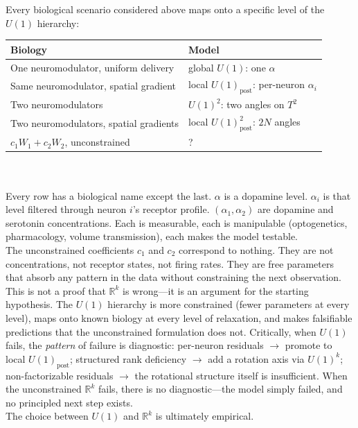 \documentclass[11pt,a4paper]{article}
\newcommand{\R}{\mathbb{R}}
\begin{document}
{Every biological scenario considered above maps onto a specific 
level of the $U(1)$ hierarchy:

\begin{center}
\renewcommand{\arraystretch}{1.3}
\begin{tabular}{@{}ll@{}}
\toprule
\textbf{Biology} & \textbf{Model} \\
\midrule
One neuromodulator, uniform delivery & 
global $U(1)$: one $\alpha$ \\
Same neuromodulator, spatial gradient & 
local $U(1)_{\text{post}}$: per-neuron $\alpha_i$ \\
Two neuromodulators & 
$U(1)^2$: two angles on $T^2$ \\
Two neuromodulators, spatial gradients & 
local $U(1)^2_{\text{post}}$: $2N$ angles \\[3pt]
$c_1 W_1 + c_2 W_2$, unconstrained & ? \\
\bottomrule
\end{tabular}
\end{center}
\\
\\
Every row has a biological name except the last. $\alpha$ is a 
dopamine level. $\alpha_i$ is that level filtered through neuron 
$i$'s receptor profile. $(\alpha_1, \alpha_2)$ are dopamine and 
serotonin concentrations. Each is measurable, each is manipulable 
(optogenetics, pharmacology, volume transmission), each makes the 
model testable.
\\
The unconstrained coefficients $c_1$ and $c_2$ correspond to 
nothing. They are not concentrations, not receptor states, not 
firing rates. They are free parameters that absorb any pattern 
in the data without constraining the next observation.
\\
This is not a proof that $\R^k$ is wrong---it is an argument 
for the starting hypothesis. The $U(1)$ hierarchy is more 
constrained (fewer parameters at every level), maps onto known 
biology at every level of relaxation, and makes falsifiable 
predictions that the unconstrained formulation does not. 
Critically, when $U(1)$ fails, the \emph{pattern} of failure 
is diagnostic: per-neuron residuals $\to$ promote to local 
$U(1)_{\text{post}}$; structured rank deficiency $\to$ add 
a rotation axis via $U(1)^k$; non-factorizable residuals $\to$ 
the rotational structure itself is insufficient. When the 
unconstrained $\R^k$ fails, there is no diagnostic---the model 
simply failed, and no principled next step exists.
\\
The choice between $U(1)$ and $\R^k$ is ultimately empirical. 
}
\end{document}
